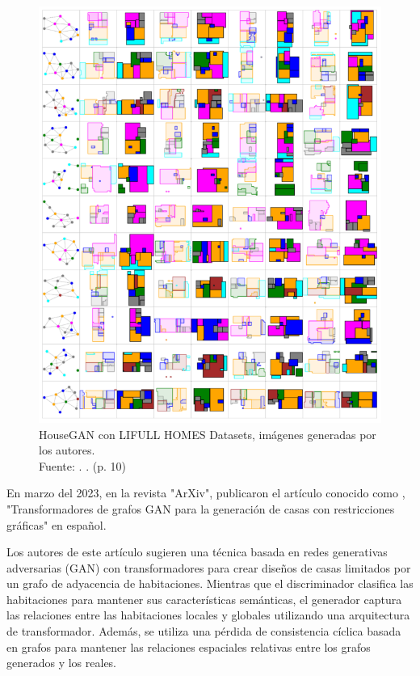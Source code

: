 \begin{figure}[!ht]
	\begin{center}
		\includegraphics[width=1\textwidth]{2/figures/ozerol2023.png}
		\caption[HouseGAN con LIFULL HOMES Datasets, imágenes generadas por los autores]{HouseGAN con LIFULL HOMES Datasets, imágenes generadas por los autores.\\
		Fuente: \cite{pr_ozerol2023genermass}. . (p. 10)}
		\label{2:fig125}
	\end{center}
\end{figure}

En marzo del 2023, en la revista "ArXiv", \cite{pr_tang2023graphtransfor} publicaron el artículo conocido como , "Transformadores de grafos GAN para la generación de casas con restricciones gráficas" en español.

Los autores de este artículo sugieren una técnica basada en redes generativas adversarias (GAN) con transformadores para crear diseños de casas limitados por un grafo de adyacencia de habitaciones. Mientras que el discriminador clasifica las habitaciones para mantener sus características semánticas, el generador captura las relaciones entre las habitaciones locales y globales utilizando una arquitectura de transformador. Además, se utiliza una pérdida de consistencia cíclica basada en grafos para mantener las relaciones espaciales relativas entre los grafos generados y los reales.

